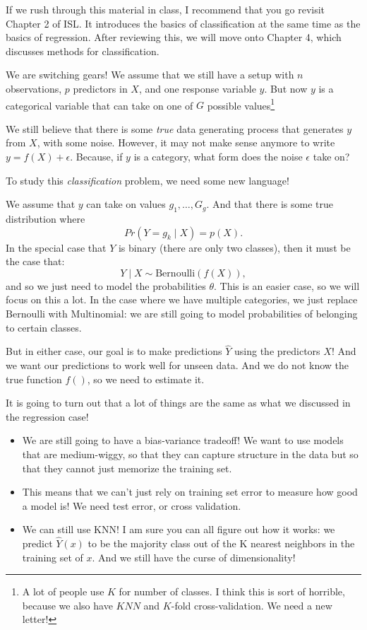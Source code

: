 If we rush through this material in class, I recommend that you go revisit Chapter 2 of ISL. It introduces the basics of classification at the same time as the basics of regression. After reviewing this, we will move onto Chapter 4, which discusses methods for classification.

We are switching gears! We assume that we still have a setup with $n$ observations, $p$ predictors in $X$, and one response variable $y$. But now $y$ is a categorical variable that can take on one of $G$ possible values\footnote{A lot of people use $K$ for number of classes. I think this is sort of horrible, because we also have $KNN$ and $K$-fold cross-validation. We need a new letter!}

We still believe that there is some \emph{true} data generating process that generates $y$ from $X$, with some noise. However, it may not make sense anymore to write $y = f(X) + \epsilon$. Because, if $y$ is a category, what form does the noise $\epsilon$ take on?

To study this \emph{classification} problem, we need some new language! 

We assume that $y$ can take on values $g_1,\ldots, G_g$. And that there is some true distribution where
$$
Pr(Y=g_k \mid X) = p(X). 
$$
In the special case that $Y$ is binary (there are only two classes), then  it must be the case that:
$$
Y \mid X \sim \mathrm{Bernoulli}(f(X)), 
$$
and so we just need to model the probabilities $\theta$.  This is an easier case, so we will focus on this a lot. In the case where we have multiple categories, we just replace $\mathrm{Bernoulli}$ with $\mathrm{Multinomial}$: we are still going to model probabilities of belonging to certain classes. 

But in either case, our goal is to make predictions $\hat{Y}$ using the predictors $X$! And we want our predictions to work well for unseen data. And we do not know the true function $f()$, so we need to estimate it. 

It is going to turn out that a lot of things are the same as what we discussed in the regression case!
\begin{itemize}
\item We are still going to have a bias-variance tradeoff! We want to use models that are medium-wiggy, so that they can capture structure in the data but so that they cannot just memorize the training set. 
\item This means that we can't just rely on training set error to measure how good a model is! We need test error, or cross validation. 
\item We can still use KNN! I am sure you can all figure out how it works: we predict $\hat{Y}(x)$ to be the majority class out of the K nearest neighbors in the training set of $x$. And we still have the curse of dimensionality!	
\end{itemize}

